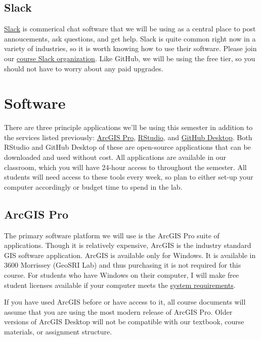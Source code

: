 \documentclass[
]{book}
\begin{document}
\hypertarget{slack}{%
\subsection{Slack}\label{slack}}

\href{http://slack.com}{Slack} is commerical chat software that we will be using as a central place to post annoucements, ask questions, and get help. Slack is quite common right now in a variety of industries, so it is worth knowing how to use their software. Please join our \href{http://slu-soc5650.slack.com}{course Slack organization}. Like GitHub, we will be using the free tier, so you should not have to worry about any paid upgrades.

\hypertarget{software}{%
\section{Software}\label{software}}

There are three principle applications we'll be using this semester in addition to the services listed previously: \href{https://pro.arcgis.com/en/pro-app/}{ArcGIS Pro}, \href{https://www.rstudio.com}{RStudio}, and \href{https://desktop.github.com}{GitHub Desktop}. Both RStudio and GitHub Desktop of these are open-source applications that can be downloaded and used without cost. All applications are available in our classroom, which you will have 24-hour access to throughout the semester. All students will need access to these tools every week, so plan to either set-up your computer accordingly or budget time to spend in the lab.

\hypertarget{arcgis-pro}{%
\subsection{ArcGIS Pro}\label{arcgis-pro}}

The primary software platform we will use is the ArcGIS Pro suite of applications. Though it is relatively expensive, ArcGIS is the industry standard GIS software application. ArcGIS is available only for Windows. It is available in 3600 Morrissey (GeoSRI Lab) and thus purchasing it is not required for this course. For students who have Windows on their computer, I will make free student licenses available if your computer meets the \href{http://pro.arcgis.com/en/pro-app/get-started/arcgis-pro-system-requirements.htm}{system requirements}.

If you have used ArcGIS before or have access to it, all course documents will assume that you are using the most modern release of ArcGIS Pro. Older versions of ArcGIS Desktop will not be compatible with our textbook, course materials, or assignment structure.
\end{document}

